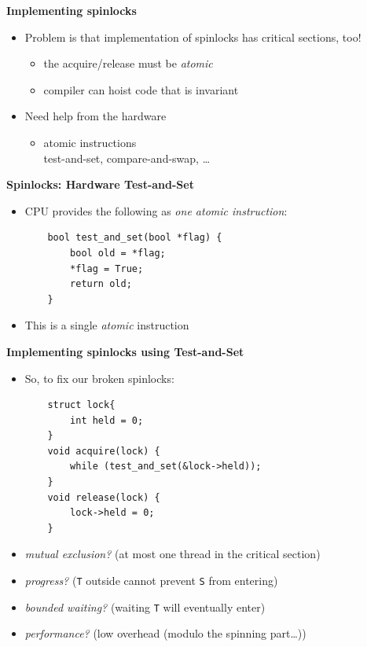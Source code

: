 \documentclass[11pt,a4paper]{article}
\begin{document}
\textbf{Implementing spinlocks}
\begin{itemize}
    \item Problem is that implementation of spinlocks has critical sections, too!
        \begin{itemize}
            \item the acquire/release must be \emph{atomic}
            \item compiler can hoist code that is invariant
        \end{itemize}
    \item Need help from the hardware
        \begin{itemize}
            \item atomic instructions \\
                test-and-set, compare-and-swap, \dots
        \end{itemize}
\end{itemize}

\textbf{Spinlocks: Hardware Test-and-Set}
\begin{itemize}
    \item CPU provides the following as \emph{one atomic instruction}:
        \begin{verbatim}
    bool test_and_set(bool *flag) {
        bool old = *flag;
        *flag = True;
        return old;
    }
        \end{verbatim}
    \item This is a single \emph{atomic} instruction
\end{itemize}

\textbf{Implementing spinlocks using Test-and-Set}
\begin{itemize}
    \item So, to fix our broken spinlocks:
        \begin{verbatim}
    struct lock{
        int held = 0;
    }
    void acquire(lock) {
        while (test_and_set(&lock->held));
    }
    void release(lock) {
        lock->held = 0;
    }
    \end{verbatim}
\item \emph{mutual exclusion?} (at most one thread in the critical section)
\item \emph{progress?} (\texttt{T} outside cannot prevent \texttt{S} from entering)
\item \emph{bounded waiting?} (waiting \texttt{T} will eventually enter)
\item \emph{performance?} (low overhead (modulo the spinning part\dots))
\end{itemize}
\end{document}
